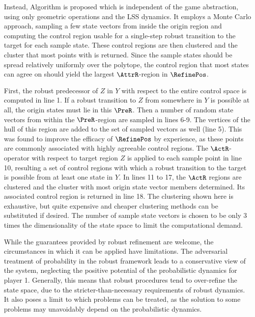     Instead, Algorithm  is proposed which is independent of the game abstraction, using only geometric operations and the LSS dynamics.
    It employs a Monte Carlo approach, sampling a few state vectors from inside the origin region and computing the control region usable for a single-step robust transition to the target for each sample state.
    These control regions are then clustered and the cluster that most points  with is returned.
    Since the sample states should be spread relatively uniformly over the polytope, the control region that most states can agree on should yield the largest $\AttrR$-region in $\RefinePos$.

    First, the robust predecessor of $Z$ in $Y$ with respect to the entire control space is computed in line 1.
    If a robust transition to $Z$ from somewhere in $Y$ is possible at all, the origin states must lie in this $\PreR$.
    Then a number of random state vectors from within the $\PreR$-region are sampled in lines 6-9.
    The vertices of the hull of this region are added to the set of sampled vectors as well (line 5).
    This was found to improve the efficacy of $\RefinePos$ by experience, as these points are commonly associated with highly agreeable control regions.
    The $\ActR$-operator with respect to target region $Z$ is applied to each sample point in line 10, resulting a set of control regions with which a robust transition to the target is possible from at least one state in $Y$.
    In lines 11 to 17, the $\ActR$ regions are clustered and the cluster with most origin state vector members determined.
    Its associated control region is returned in line 18.
    The clustering shown here is exhaustive, but quite expensive and cheaper clustering methods can be substituted if desired.
    The number of sample state vectors is chosen to be only 3 times the dimensionality of the state space to limit the computational demand.

\stopsubsection


\startsubsection[title={Limitations of Robust Refinement},reference=sec:refinement-robust-limitations]

    While the guarantees provided by robust refinement are welcome, the circumstances in which it can be applied have limitations.
    The adversarial treatment of probability in the robust framework leads to a conservative view of the system, neglecting the positive potential of the probabilistic dynamics for player 1.
    Generally, this means that robust procedures tend to over-refine the state space, due to the stricter-than-necessary requirements of robust dynamics.
    It also poses a limit to which problems can be treated, as the solution to some problems may unavoidably depend on the probabilistic dynamics.


